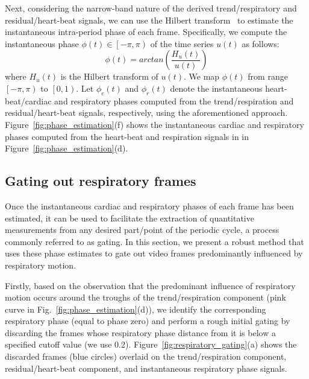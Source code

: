 \documentclass[runningheads,a4paper]{llncs}
\begin{document}
	Next, considering the narrow-band nature of the derived trend/respiratory and residual/heart-beat signals, we can use the Hilbert transform~\cite{Lu2013} to estimate the instantaneous intra-period phase of each frame. Specifically, we compute the instantaneous phase $\phi(t) \in \left [  -\pi, \pi\right )$ of the time series $u(t)$ as follows:
\begin{equation}
\phi(t) = arctan \left( \frac{H_u(t)}{u(t)}\right)
\end{equation} 
where $H_u(t)$ is the Hilbert transform of $u(t)$. We map $\phi(t)$ from range $\left [  -\pi, \pi\right )$ to $\left [  0, 1\right )$. Let $\phi_c(t)$ and $\phi_r(t)$ denote the instantaneous heart-beat/cardiac and respiratory phases computed from the trend/respiration and residual/heart-beat signals, respectively, using the aforementioned approach. Figure~\ref{fig:phase_estimation}(f) shows the instantaneous cardiac and respiratory phases computed from the heart-beat and respiration signals in in Figure~\ref{fig:phase_estimation}(d). 

\subsection{Gating out respiratory frames}
\label{sec:method:gating}
%
Once the instantaneous cardiac and respiratory phases of each frame has been estimated, it can be used to facilitate the extraction of quantitative measurements from any desired part/point of the periodic cycle, a process commonly referred to as gating. In this section, we present a robust method that uses these phase estimates to gate out video frames predominantly influenced by respiratory motion.

	Firstly, based on the observation that the predominant influence of respiratory motion occurs around the troughs of the trend/respiration component (pink curve in Fig.~\ref{fig:phase_estimation}(d)), we identify the corresponding respiratory phase (equal to phase zero) and perform a rough initial gating by discarding the frames whose respiratory phase distance from it is below a specified cutoff value (we use 0.2). Figure~\ref{fig:respiratory_gating}(a) shows the discarded frames (blue circles) overlaid on the trend/respiration component, residual/heart-beat component, and instantaneous respiratory phase signals.
	
	
	
\end{document}
